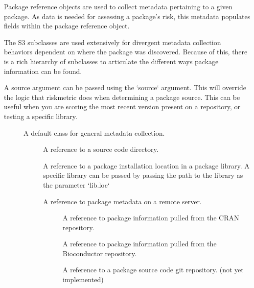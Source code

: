 \documentclass[a4paper]{book}
\begin{document}
%
\begin{Details}
Package reference objects are used to collect metadata pertaining to a given
package. As data is needed for assessing a package's risk, this metadata
populates fields within the package reference object.

The  S3 subclasses are used extensively for divergent metadata
collection behaviors dependent on where the package was discovered. Because
of this, there is a rich hierarchy of subclasses to articulate the different
ways package information can be found.

A source argument can be passed using the `source` argument. This will
override the logic that riskmetric does when determining a package source.
This can be useful when you are scoring the most recent version present on a
repository, or testing a specific library.

\begin{description}

\item[]  A default class for general metadata
collection.
\begin{description}

\item[]  A reference to a source code directory.
\item[]  A reference to a package installation
location in a package library. A specific library can be passed by passing
the path to the library as the parameter `lib.loc`
\item[]  A reference to package metadata on a
remote server.
\begin{description}

\item[]  A reference to package
information pulled from the CRAN repository.
\item[]  A reference to package
information pulled from the Bioconductor repository.
\item[]  A reference to a package source
code git repository. (not yet implemented)

\end{description}


\end{description}


\end{description}

\end{Details}
\end{document}
